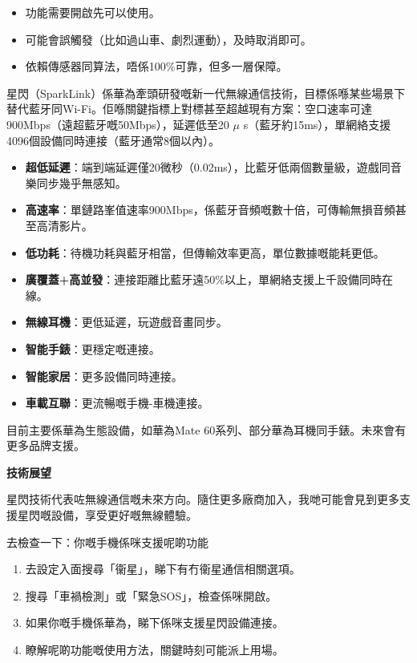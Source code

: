 \begin{itemize}
  \item 功能需要開啟先可以使用。
  \item 可能會誤觸發（比如過山車、劇烈運動），及時取消即可。
  \item 依賴傳感器同算法，唔係100\%可靠，但多一層保障。
\end{itemize}


星閃（SparkLink）係華為牽頭研發嘅新一代無線通信技術，目標係喺某些場景下替代藍牙同Wi-Fi。佢喺關鍵指標上對標甚至超越現有方案：空口速率可達900Mbps（遠超藍牙嘅50Mbps），延遲低至20 $\mu$ s（藍牙約15ms），單網絡支援4096個設備同時連接（藍牙通常8個以內）。


\begin{itemize}
  \item \textbf{超低延遲}：端到端延遲僅20微秒（0.02ms），比藍牙低兩個數量級，遊戲同音樂同步幾乎無感知。
  \item \textbf{高速率}：單鏈路峯值速率900Mbps，係藍牙音頻嘅數十倍，可傳輸無損音頻甚至高清影片。
  \item \textbf{低功耗}：待機功耗與藍牙相當，但傳輸效率更高，單位數據嘅能耗更低。
  \item \textbf{廣覆蓋+高並發}：連接距離比藍牙遠50\%以上，單網絡支援上千設備同時在線。
\end{itemize}


\begin{itemize}
  \item \textbf{無線耳機}：更低延遲，玩遊戲音畫同步。
  \item \textbf{智能手錶}：更穩定嘅連接。
  \item \textbf{智能家居}：更多設備同時連接。
  \item \textbf{車載互聯}：更流暢嘅手機-車機連接。
\end{itemize}


目前主要係華為生態設備，如華為Mate 60系列、部分華為耳機同手錶。未來會有更多品牌支援。

\textbf{技術展望}\par

星閃技術代表咗無線通信嘅未來方向。隨住更多廠商加入，我哋可能會見到更多支援星閃嘅設備，享受更好嘅無線體驗。

\begin{tcbpractice}{去檢查一下：你嘅手機係咪支援呢啲功能}
\begin{enumerate}
  \item 去設定入面搜尋「衞星」，睇下有冇衞星通信相關選項。
  \item 搜尋「車禍檢測」或「緊急SOS」，檢查係咪開啟。
  \item 如果你嘅手機係華為，睇下係咪支援星閃設備連接。
  \item 瞭解呢啲功能嘅使用方法，關鍵時刻可能派上用場。
\end{enumerate}

\end{tcbpractice}
